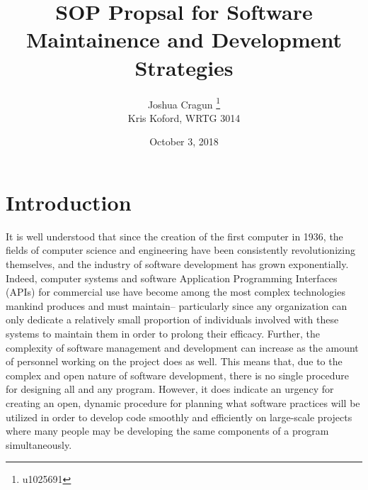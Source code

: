 \documentclass[12pt, letterpaper]{article}
\title{SOP Propsal for Software Maintainence and Development Strategies}
\author{Joshua Cragun \thanks{u1025691} \\ Kris Koford, WRTG 3014}
\date{October 3, 2018}
\begin{document}
\begin{titlepage}
\maketitle
\end{titlepage}

\pagebreak

\section{Introduction}
  It is well understood that since the creation of the first computer in 1936, the fields of computer science and engineering have been consistently revolutionizing themselves, and the industry of
  software development has grown exponentially. Indeed, computer systems and software Application Programming Interfaces (APIs) for commercial use have become among the most complex technologies
  mankind produces and must maintain-- particularly since any organization can only dedicate a relatively small proportion of individuals involved with these systems to maintain them in order to
  prolong their efficacy. Further, the complexity of software management and development can increase as the amount of personnel working on the project does as well. This means that, due to the
  complex and open nature of software development, there is no single procedure for designing all and any program. However, it does indicate an urgency for creating an open, dynamic procedure for planning
  what software practices will be utilized in order to develop code smoothly and efficiently on large-scale projects where many people may be developing the same components of a program simultaneously.
\end{document}
